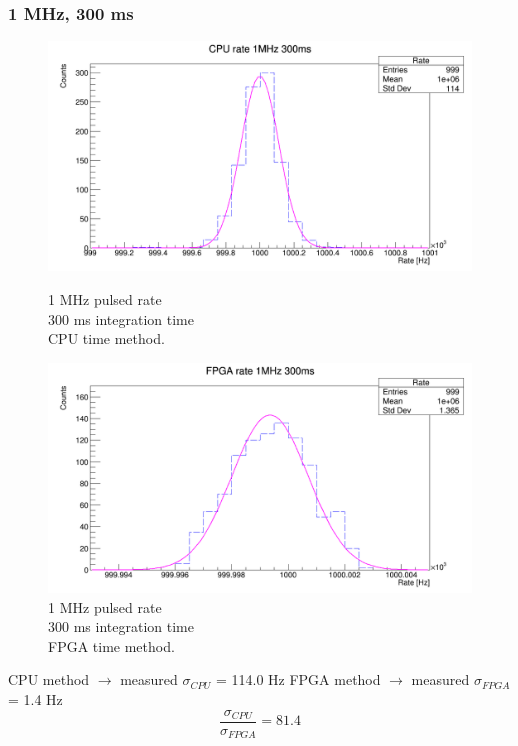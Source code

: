 \subsubsection{1 MHz, 300 ms}
\begin{figure}[H]
	\centering
	\begin{minipage}{0.49\textwidth}
		\centering
		\includegraphics[width=.99\linewidth]{IMG/ch5/RateMeasures/CPU-time-rate-1MHz-300ms}
		\caption{1 MHz pulsed rate\\300 ms integration time\\CPU time method.}
		\label{fig:CPU-time-rate-1MHz-300ms}
	\end{minipage}%
	\begin{minipage}{0.49\textwidth}
		\centering
		\includegraphics[width=.99\linewidth]{IMG/ch5/RateMeasures/FPGA-time-rate-1MHz-300ms}
		\caption{1 MHz pulsed rate\\300 ms integration time\\FPGA time method.}
		\label{fig:FPGA-time-rate-1MHz-300ms}
	\end{minipage}
\end{figure}
\noindent CPU method $\rightarrow$ measured $\sigma_{CPU}$ = 114.0 Hz
\newline
FPGA method $\rightarrow$ measured $\sigma_{FPGA}$ = 1.4 Hz
\begin{equation}
	\frac{\sigma_{CPU}}{\sigma_{FPGA}} = 81.4
\end{equation}

